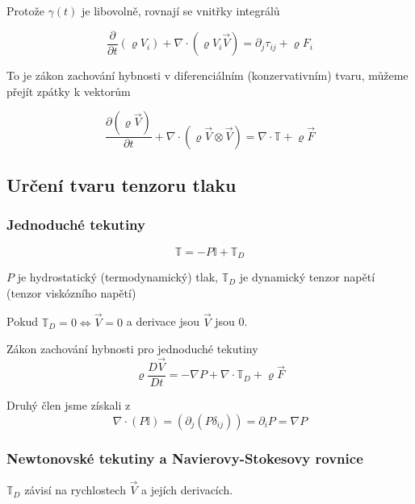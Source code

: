 \documentclass[../main.tex]{subfiles}
\begin{document}
Protože $\gamma(t)$ je libovolně, rovnají se vnitřky integrálů

\begin{equation}
     \frac{\partial}{\partial t} (\varrho V_i) + \nabla \cdot (\varrho V_i \vec{V}) =  \partial_j \tau_{ij} + \varrho F_i 
\end{equation}

To je zákon zachování hybnosti v diferenciálním (konzervativním) tvaru, můžeme přejít zpátky k vektorům

\begin{equation}
    \frac{\partial(\varrho \vec{V})}{\partial t} + \nabla \cdot (\varrho \vec{V} \otimes \vec{V}) = \nabla \cdot \mathbb{T} + \varrho \vec{F}
\end{equation}


\subsection{Určení tvaru tenzoru tlaku}

\subsubsection{Jednoduché tekutiny}
\begin{equation}
    \mathbb{T} = - P \mathbb{I} + \mathbb{T}_D
\end{equation}

$P$ je hydrostatický (termodynamický) tlak, $\mathbb{T}_D$ je dynamický tenzor napětí (tenzor viskózního napětí)

Pokud    $\mathbb{T}_D = 0 \Leftrightarrow \vec{V} = 0 $ a derivace jsou $\vec{V}$ jsou 0.


Zákon zachování hybnosti pro jednoduché tekutiny
\begin{equation}
    \varrho \frac{D\vec{V}}{Dt} = -\nabla P + \nabla \cdot \mathbb{T}_D + \varrho \vec{F}
\end{equation}

Druhý člen jsme získali z
\begin{equation}
    \nabla\cdot(P\mathbb{I}) = (\partial_j (P \delta_{ij})) =  \partial_i P = \nabla P
\end{equation}

\subsubsection{Newtonovské tekutiny a Navierovy-Stokesovy rovnice}

$\mathbb{T}_D$ závisí na rychlostech $\vec{V}$ a jejích derivacích.
\end{document}
